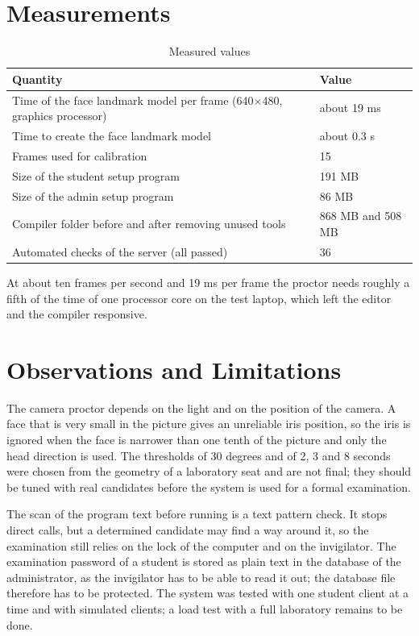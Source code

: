 \documentclass[12pt,a4paper]{report}
\begin{document}
\section{Measurements}
\begin{table}[H]
\centering
\caption{Measured values}\label{tab:meas}
\footnotesize
\begin{tabularx}{\textwidth}{@{}Y L{3.4cm}@{}}
\toprule
\textbf{Quantity} & \textbf{Value}\\
\midrule
Time of the face landmark model per frame (640$\times$480, graphics processor) & about 19 ms\\
Time to create the face landmark model & about 0.3 s\\
Frames used for calibration & 15\\
Size of the student setup program & 191 MB\\
Size of the admin setup program & 86 MB\\
Compiler folder before and after removing unused tools & 868 MB and 508 MB\\
Automated checks of the server (all passed) & 36\\
\bottomrule
\end{tabularx}
\end{table}

At about ten frames per second and 19 ms per frame the proctor needs roughly a fifth of the time of one processor core on the test laptop, which left the editor and the compiler responsive.

\section{Observations and Limitations}
The camera proctor depends on the light and on the position of the camera. A face that is very small in the picture gives an unreliable iris position, so the iris is ignored when the face is narrower than one tenth of the picture and only the head direction is used. The thresholds of 30 degrees and of 2, 3 and 8 seconds were chosen from the geometry of a laboratory seat and are not final; they should be tuned with real candidates before the system is used for a formal examination.

The scan of the program text before running is a text pattern check. It stops direct calls, but a determined candidate may find a way around it, so the examination still relies on the lock of the computer and on the invigilator. The examination password of a student is stored as plain text in the database of the administrator, as the invigilator has to be able to read it out; the database file therefore has to be protected. The system was tested with one student client at a time and with simulated clients; a load test with a full laboratory remains to be done.
\end{document}
